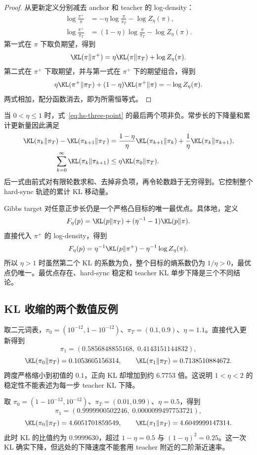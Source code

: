 \begin{proof}
从更新定义分别减去 anchor 和 teacher 的 log-density：
\begin{align*}
 \log\frac{\pi^+}{\pi}
 &=-\eta\log\frac{\pi}{\pi_T}-\log Z_\eta(\pi),\\
 \log\frac{\pi^+}{\pi_T}
 &=(1-\eta)\log\frac{\pi}{\pi_T}-\log Z_\eta(\pi).
\end{align*}
第一式在 $\pi$ 下取负期望，得到
\[
 \KL(\pi\Vert\pi^+)
 =\eta\KL(\pi\Vert\pi_T)+\log Z_\eta(\pi).
\]
第二式在 $\pi^+$ 下取期望，并与第一式在 $\pi^+$ 下的期望组合，得到
\[
 \eta\KL(\pi^+\Vert\pi_T)
 +(1-\eta)\KL(\pi^+\Vert\pi)
 =-\log Z_\eta(\pi).
\]
两式相加，配分函数消去，即为所需恒等式。
\end{proof}

当 $0<\eta\leq1$ 时，式~\eqref{eq:hs-three-point} 的最后两个项非负。常步长的下降量和累计更新量因此满足
\begin{align*}
 \KL(\pi_k\Vert\pi_T)-\KL(\pi_{k+1}\Vert\pi_T)
 &=\frac{1-\eta}{\eta}\KL(\pi_{k+1}\Vert\pi_k)
 +\frac1\eta\KL(\pi_k\Vert\pi_{k+1}),\\
 \sum_{k=0}^{\infty}\KL(\pi_k\Vert\pi_{k+1})
 &\leq\eta\KL(\pi_0\Vert\pi_T).
\end{align*}
后一式由前式对有限轮数求和、去掉非负项，再令轮数趋于无穷得到。它控制整个 hard-sync 轨迹的累计 KL 移动量。

Gibbs target 对任意正步长仍是一个严格凸目标的唯一最优点。具体地，定义
\[
 F_\eta(p)=\KL(p\Vert\pi_T)
 +(\eta^{-1}-1)\KL(p\Vert\pi).
\]
直接代入 $\pi^+$ 的 log-density，得到
\[
 F_\eta(p)=\eta^{-1}\KL(p\Vert\pi^+)
 -\eta^{-1}\log Z_\eta(\pi).
\]
所以 $\eta>1$ 时虽然第二个 KL 的系数为负，整个目标的熵系数仍为 $1/\eta>0$，最优点仍唯一。最优点存在、hard-sync 稳定和 teacher KL 单步下降是三个不同结论。

\subsection{KL 收缩的两个数值反例}

取二元词表，$\pi_0=(10^{-12},1-10^{-12})$、$\pi_T=(0.1,0.9)$、$\eta=1.1$。直接代入更新得到
\[
 \pi_1=(0.5856848855168,\;0.4143151144832),
\]
\[
 \KL(\pi_0\Vert\pi_T)=0.1053605156314,
 \qquad\KL(\pi_1\Vert\pi_T)=0.7138510884672.
\]
跨度严格缩小到初值的 $0.1$，正向 KL 却增加到约 $6.7753$ 倍。这说明 $1<\eta<2$ 的稳定性不能表述为每一步 teacher KL 下降。

取 $\pi_0=(1-10^{-12},10^{-12})$、$\pi_T=(0.01,0.99)$、$\eta=0.5$，得到
\[
 \pi_1=(0.9999900502246,\;0.0000099497753721),
\]
\[
 \KL(\pi_0\Vert\pi_T)=4.6051701859549,
 \qquad\KL(\pi_1\Vert\pi_T)=4.6049999147314.
\]
此时 KL 的比值约为 $0.9999630$，超过 $1-\eta=0.5$ 与 $(1-\eta)^2=0.25$。这一次 KL 确实下降，但远处的下降速度不能套用 teacher 附近的二阶渐近速率。

